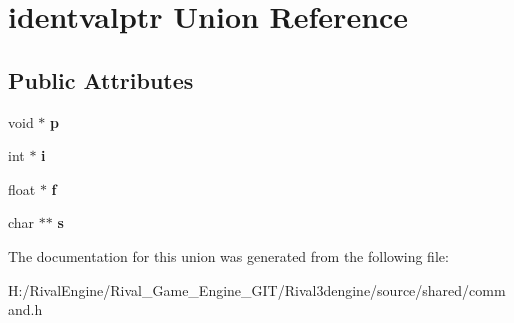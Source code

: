 \hypertarget{unionidentvalptr}{}\section{identvalptr Union Reference}
\label{unionidentvalptr}
\subsection*{Public Attributes}
\begin{DoxyCompactItemize}
\item 
\mbox{\label{unionidentvalptr_aae62d06293f0dcf008d1e5aef379460a}} 
void $\ast$ {\bfseries p}
\item 
\mbox{\label{unionidentvalptr_ae2e82c4f1b5f265092230fb14dde49c6}} 
int $\ast$ {\bfseries i}
\item 
\mbox{\label{unionidentvalptr_a91de2d8388f418de54df391dab062f32}} 
float $\ast$ {\bfseries f}
\item 
\mbox{\label{unionidentvalptr_affd0c20a4ded5b974083f1b858b78aa1}} 
char $\ast$$\ast$ {\bfseries s}
\end{DoxyCompactItemize}


The documentation for this union was generated from the following file\+:\begin{DoxyCompactItemize}
\item 
H\+:/\+Rival\+Engine/\+Rival\+\_\+\+Game\+\_\+\+Engine\+\_\+\+G\+I\+T/\+Rival3dengine/source/shared/command.\+h\end{DoxyCompactItemize}
